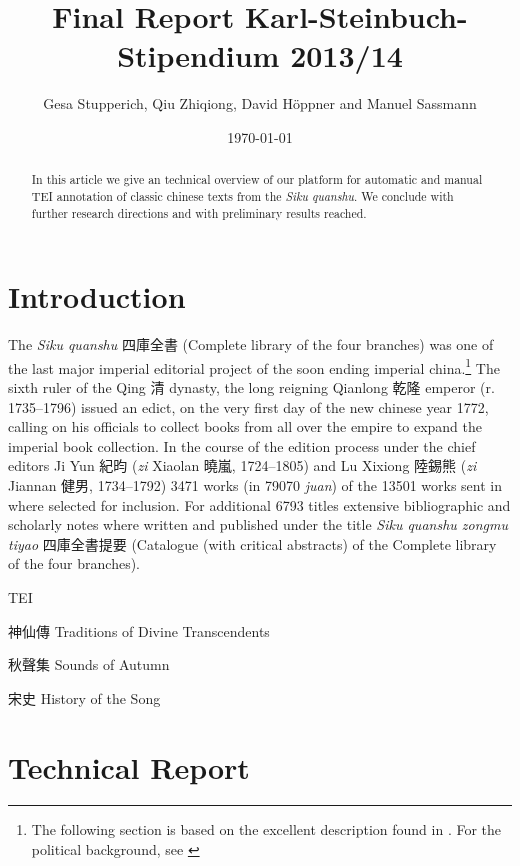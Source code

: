 \documentclass[12pt, draft]{article}
\begin{document}
\title{Final Report Karl-Steinbuch-Stipendium 2013/14}
\author{Gesa Stupperich, Qiu Zhiqiong, David Höppner and Manuel Sassmann}
\date{\today}
\maketitle

\begin{abstract}
In this article we
give an technical overview of
our platform for automatic and manual
TEI annotation of classic chinese texts from the \emph{Siku quanshu}.
We conclude with further research directions and
with preliminary results reached.
\end{abstract}

\section{Introduction}

The \emph{Siku quanshu} 四庫全書 (Complete library of the four branches)
was one of the last major imperial editorial project of the
soon ending imperial china.\footnote{The following section is based on the excellent
description found in \cite[945-954]{Wilkinson:2012}. For the political
background, see \cite{Guy:1987}}
The sixth ruler of the Qing 清 dynasty, the long reigning
Qianlong 乾隆 emperor (r. 1735--1796) issued an edict,
on the very first
day of the new chinese year 1772, calling on his officials to collect books from
all over the empire to expand the imperial book collection.
In the course of the edition process under the
chief editors Ji Yun 紀昀 (\emph{zi} Xiaolan 曉嵐, 1724--1805) and Lu Xixiong 陸錫熊
(\emph{zi} Jiannan 健男, 1734--1792) 3471 works (in 79070 \emph{juan})
of the 13501 works sent in where selected for inclusion.
For additional 6793 titles extensive bibliographic and scholarly
notes where written and published under the title \emph{Siku quanshu zongmu tiyao}
四庫全書提要 (Catalogue (with critical abstracts) of the Complete library of the 
four branches).

TEI

神仙傳 Traditions of Divine Transcendents

秋聲集 Sounds of Autumn

宋史 History of the Song

 
\section{Technical Report}
\end{document}
